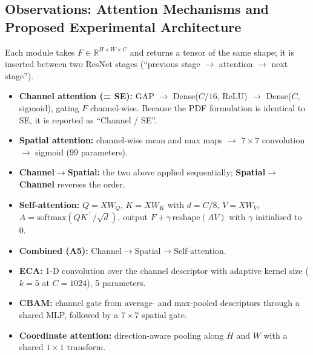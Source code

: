 \documentclass[10pt]{article}
\begin{document}
\subsection*{Observations: Attention Mechanisms and Proposed Experimental Architecture}
Each module takes $F\in\mathbb{R}^{H\times W\times C}$ and returns a tensor of the same shape; it is inserted between two ResNet stages (``previous stage $\to$ attention $\to$ next stage'').
\begin{itemize}
\item \textbf{Channel attention (= SE):} GAP $\to$ Dense($C/16$, ReLU) $\to$ Dense($C$, sigmoid), gating $F$ channel-wise. Because the PDF formulation is identical to SE, it is reported as ``Channel / SE''.
\item \textbf{Spatial attention:} channel-wise mean and max maps $\to$ $7\times7$ convolution $\to$ sigmoid (99 parameters).
\item \textbf{Channel$\to$Spatial:} the two above applied sequentially; \textbf{Spatial$\to$Channel} reverses the order.
\item \textbf{Self-attention:} $Q=XW_Q$, $K=XW_K$ with $d=C/8$, $V=XW_V$, $A=\mathrm{softmax}(QK^\top/\sqrt d)$, output $F+\gamma\,\mathrm{reshape}(AV)$ with $\gamma$ initialised to 0.
\item \textbf{Combined (A5):} Channel$\to$Spatial$\to$Self-attention.
\item \textbf{ECA:} 1-D convolution over the channel descriptor with adaptive kernel size ($k=5$ at $C=1024$), 5 parameters.
\item \textbf{CBAM:} channel gate from average- and max-pooled descriptors through a shared MLP, followed by a $7\times7$ spatial gate.
\item \textbf{Coordinate attention:} direction-aware pooling along $H$ and $W$ with a shared $1\times1$ transform.
\end{itemize}
\begin{table}[H]
\centering
\caption{Observation 1 -- feature dimensions immediately before and after the attention block (none of the modules changes $H$, $W$ or $C$).}
\scriptsize
{}
\end{table}
\end{document}
